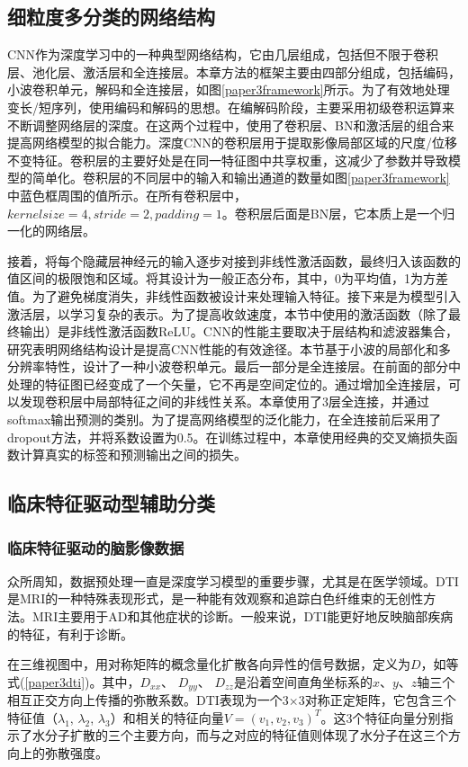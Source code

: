 \subsection{细粒度多分类的网络结构}\label{paper3WCU-Net}
CNN作为深度学习中的一种典型网络结构，它由几层组成，包括但不限于卷积层、池化层、激活层和全连接层。本章方法的框架主要由四部分组成，包括编码，小波卷积单元，解码和全连接层，如图\ref{paper3framework}所示。为了有效地处理变长/短序列，使用编码和解码的思想。在编解码阶段，主要采用初级卷积运算来不断调整网络层的深度。在这两个过程中，使用了卷积层、BN和激活层的组合来提高网络模型的拟合能力。深度CNN的卷积层用于提取影像局部区域的尺度/位移不变特征。卷积层的主要好处是在同一特征图中共享权重，这减少了参数并导致模型的简单化。卷积层的不同层中的输入和输出通道的数量如图\ref{paper3framework}中蓝色框周围的值所示。在所有卷积层中，$kernel size=4, stride=2, padding=1$。卷积层后面是BN层，它本质上是一个归一化的网络层。

接着，将每个隐藏层神经元的输入逐步对接到非线性激活函数，最终归入该函数的值区间的极限饱和区域。将其设计为一般正态分布，其中，0为平均值，1为方差值。为了避免梯度消失，非线性函数被设计来处理输入特征。接下来是为模型引入激活层，以学习复杂的表示。为了提高收敛速度，本节中使用的激活函数（除了最终输出）是非线性激活函数ReLU。CNN的性能主要取决于层结构和滤波器集合，研究表明网络结构设计是提高CNN性能的有效途径\cite{liang2021cameranet}。本节基于小波的局部化和多分辨率特性，设计了一种小波卷积单元。最后一部分是全连接层。在前面的部分中处理的特征图已经变成了一个矢量，它不再是空间定位的。通过增加全连接层，可以发现卷积层中局部特征之间的非线性关系。本章使用了3层全连接，并通过softmax输出预测的类别。为了提高网络模型的泛化能力，在全连接前后采用了dropout方法，并将系数设置为0.5。在训练过程中，本章使用经典的交叉熵损失函数计算真实的标签和预测输出之间的损失。


\subsection{临床特征驱动型辅助分类}\label{paper3WCUNetClassify}

\subsubsection{临床特征驱动的脑影像数据}
众所周知，数据预处理一直是深度学习模型的重要步骤，尤其是在医学领域。DTI是MRI的一种特殊表现形式，是一种能有效观察和追踪白色纤维束的无创性方法。MRI主要用于AD和其他症状的诊断。一般来说，DTI能更好地反映脑部疾病的特征，有利于诊断。

在三维视图中，用对称矩阵的概念量化扩散各向异性的信号数据，定义为$D$，如等式(\ref{paper3dti})。其中，$D_{xx}$、 $D_{yy}$、 $D_{zz}$是沿着空间直角坐标系的$x$、$y$、$z$轴三个相互正交方向上传播的弥散系数。DTI表现为一个3$\times$3对称正定矩阵，它包含三个特征值（$\lambda_{1}$, $\lambda_{2}$, $\lambda_{3}$）和相关的特征向量$V=(v_1, v_2, v_3)^T$。这3个特征向量分别指示了水分子扩散的三个主要方向，而与之对应的特征值则体现了水分子在这三个方向上的弥散强度。


